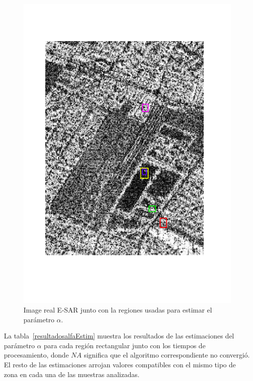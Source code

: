 \begin{figure}[h!]
	\centering
	\includegraphics[width=.52\linewidth,angle=-90]{../../Figures/Tesis/Capitulo6/MunchCortadaReg.pdf}
	\caption{\label{reales2}Image real E-SAR junto con la regiones usadas para estimar el parámetro $\alpha$.}
\end{figure}

La tabla~\ref{resultadosalfaEstim} muestra los resultados de las estimaciones del parámetro $\alpha$ para cada región rectangular junto con los tiempos de procesamiento, donde $NA$ significa que el algoritmo correspondiente no convergió. El resto de las estimaciones arrojan valores compatibles con el mismo tipo de zona en cada una de las muestras analizadas.

